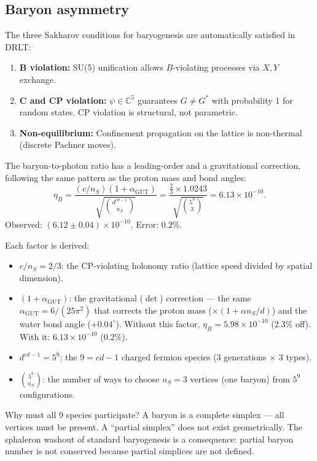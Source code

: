 \documentclass[12pt]{article}
\theoremstyle{remark}
\theoremstyle{definition}
\begin{document}
\subsection{Baryon asymmetry}

The three Sakharov conditions for baryogenesis are automatically satisfied in DRLT:
\begin{enumerate}
\item \textbf{B violation:} SU(5) unification allows $B$-violating processes via $X, Y$ exchange.
\item \textbf{C and CP violation:} $\psi \in \mathbb{C}^5$ guarantees $G \neq G^*$ with probability 1 for random states. CP violation is structural, not parametric.
\item \textbf{Non-equilibrium:} Confinement propagation on the lattice is non-thermal (discrete Pachner moves).
\end{enumerate}

The baryon-to-photon ratio has a leading-order and a gravitational correction, following the same pattern as the proton mass and bond angles:
\begin{equation}
\eta_B = \frac{(c/n_S)(1 + \alpha_\text{GUT})}{\sqrt{\binom{d^{cd-1}}{n_S}}} = \frac{\frac{2}{3} \times 1.0243}{\sqrt{\binom{5^9}{3}}} = 6.13 \times 10^{-10}.
\end{equation}
Observed: $(6.12 \pm 0.04) \times 10^{-10}$. Error: $0.2\%$.

Each factor is derived:
\begin{itemize}
\item $c/n_S = 2/3$: the CP-violating holonomy ratio (lattice speed divided by spatial dimension).
\item $(1 + \alpha_\text{GUT})$: the gravitational ($\det$) correction --- the same $\alpha_\text{GUT} = 6/(25\pi^2)$ that corrects the proton mass ($\times(1 + \alpha n_S/d)$) and the water bond angle ($+0.04^\circ$). Without this factor, $\eta_B = 5.98 \times 10^{-10}$ ($2.3\%$ off). With it: $6.13 \times 10^{-10}$ ($0.2\%$).
\item $d^{cd-1} = 5^9$: the $9 = cd - 1$ charged fermion species ($3$ generations $\times$ $3$ types).
\item $\binom{5^9}{n_S}$: the number of ways to choose $n_S = 3$ vertices (one baryon) from $5^9$ configurations.
\end{itemize}

Why must all 9 species participate? A baryon is a complete simplex --- all vertices must be present. A ``partial simplex'' does not exist geometrically. The sphaleron washout of standard baryogenesis is a consequence: partial baryon number is not conserved because partial simplices are not defined.
\end{document}
